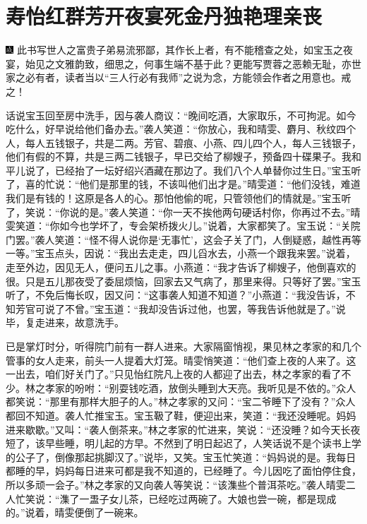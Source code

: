 

\chapter{寿怡红群芳开夜宴\hspace{.5em}死金丹独艳理亲丧}

{\includegraphics[width=3mm]{../Images/00005} \kaishu 此书写世人之富贵子弟易流邪鄙，其作长上者，有不能稽查之处，如宝玉之夜宴，始见之文雅韵致，细思之，何事生端不基于此？更能写贾蓉之恶赖无耻，亦世家之必有者，读者当以“三人行必有我师”之说为念，方能领会作者之用意也。戒之！}

话说宝玉回至房中洗手，因与袭人商议：“晚间吃酒，大家取乐，不可拘泥。如今吃什么，好早说给他们备办去。”袭人笑道：“你放心，我和晴雯、麝月、秋纹四个人，每人五钱银子，共是二两。芳官、碧痕、小燕、四儿四个人，每人三钱银子，他们有假的不算，共是三两二钱银子，早已交给了柳嫂子，预备四十碟果子。我和平儿说了，已经抬了一坛好绍兴酒藏在那边了。我们八个人单替你过生日。”宝玉听了，喜的忙说：“他们是那里的钱，不该叫他们出才是。”晴雯道：“他们没钱，难道我们是有钱的！这原是各人的心。那怕他偷的呢，只管领他们的情就是。”宝玉听了，笑说：“你说的是。”袭人笑道：“你一天不挨他两句硬话村你，你再过不去。”晴雯笑道：“你如今也学坏了，专会架桥拨火儿。”说着，大家都笑了。宝玉说：“关院门罢。”袭人笑道：“怪不得人说你是‘无事忙’，这会子关了门，人倒疑惑，越性再等一等。”宝玉点头，因说：“我出去走走，四儿舀水去，小燕一个跟我来罢。”说着，走至外边，因见无人，便问五儿之事。小燕道：“我才告诉了柳嫂子，他倒喜欢的很。只是五儿那夜受了委屈烦恼，回家去又气病了，那里来得。只等好了罢。”宝玉听了，不免后悔长叹，因又问：“这事袭人知道不知道？”小燕道：“我没告诉，不知芳官可说了不曾。”宝玉道：“我却没告诉过他，也罢，等我告诉他就是了。”说毕，复走进来，故意洗手。

已是掌灯时分，听得院门前有一群人进来。大家隔窗悄视，果见林之孝家的和几个管事的女人走来，前头一人提着大灯笼。晴雯悄笑道：“他们查上夜的人来了。这一出去，咱们好关门了。”只见怡红院凡上夜的人都迎了出去，林之孝家的看了不少。林之孝家的吩咐：“别耍钱吃酒，放倒头睡到大天亮。我听见是不依的。”众人都笑说：“那里有那样大胆子的人。”林之孝家的又问：“宝二爷睡下了没有？”众人都回不知道。袭人忙推宝玉。宝玉靸了鞋，便迎出来，笑道：“我还没睡呢。妈妈进来歇歇。”又叫：“袭人倒茶来。”林之孝家的忙进来，笑说：“还没睡？如今天长夜短了，该早些睡，明儿起的方早。不然到了明日起迟了，人笑话说不是个读书上学的公子了，倒像那起挑脚汉了。”说毕，又笑。宝玉忙笑道：“妈妈说的是。我每日都睡的早，妈妈每日进来可都是我不知道的，已经睡了。今儿因吃了面怕停住食，所以多顽一会子。”林之孝家的又向袭人等笑说：“该潗些个普洱茶吃。”袭人晴雯二人忙笑说：“潗了一盄子女儿茶，已经吃过两碗了。大娘也尝一碗，都是现成的。”说着，晴雯便倒了一碗来。

